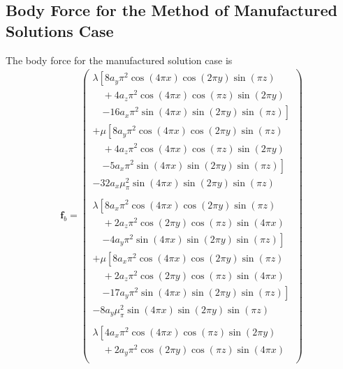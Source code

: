 \documentclass[sn-mathphys,Numbered]{sn-jnl}%
\newcommand{\bb}{\boldsymbol}
\begin{document}
\begin{appendices}

\section{Body Force for the Method of Manufactured Solutions Case} \label{app:mms}
The body force for the manufactured solution case is
\begin{align}
\bb{f}_b = 
    \begin{pmatrix}
    \lambda
    \left[
        8 a_y \pi^2 \cos(4\pi x) \cos(2\pi y) \sin(\pi z) \right. \\
        \quad + 4 a_z \pi^2 \cos(4\pi x) \cos(\pi z) \sin(2\pi y) \\
        \quad \left. - 16 a_x \pi^2 \sin(4\pi x) \sin(2\pi y) \sin(\pi z)
    \right] \\
    + \mu
    \left[
        8 a_y \pi^2 \cos(4\pi x) \cos(2\pi y) \sin(\pi z) \right. \\
        \quad + 4 a_z \pi^2 \cos(4\pi x) \cos(\pi z) \sin(2\pi y) \\
        \quad \left. - 5 a_x \pi^2 \sin(4\pi x) \sin(2\pi y) \sin(\pi z)
    \right] \\
    - 32 a_x \mu_ \pi^2 \sin(4\pi x) \sin(2\pi y) \sin(\pi z) \\
    \\
    \lambda
    \left[
        8 a_x \pi^2 \cos(4\pi x) \cos(2\pi y) \sin(\pi z) \right. \\
        \quad + 2 a_z \pi^2 \cos(2\pi y) \cos(\pi z) \sin(4\pi x) \\
        \quad \left. - 4 a_y \pi^2 \sin(4\pi x) \sin(2\pi y) \sin(\pi z)
    \right] \\
    + \mu
    \left[
        8 a_x \pi^2 \cos(4\pi x) \cos(2\pi y) \sin(\pi z) \right. \\
        \quad + 2 a_z \pi^2 \cos(2\pi y) \cos(\pi z) \sin(4\pi x) \\
        \quad \left. - 17 a_y \pi^2 \sin(4\pi x) \sin(2\pi y) \sin(\pi z)
    \right] \\
    - 8 a_y \mu_ \pi^2 \sin(4\pi x) \sin(2\pi y) \sin(\pi z) \\
    \\
    \lambda
    \left[
        4 a_x \pi^2 \cos(4\pi x) \cos(\pi z) \sin(2\pi y) \right. \\
        \quad + 2 a_y \pi^2 \cos(2\pi y) \cos(\pi z) \sin(4\pi x) \\

\end{pmatrix}
\end{align}
\end{appendices}
\end{document}
